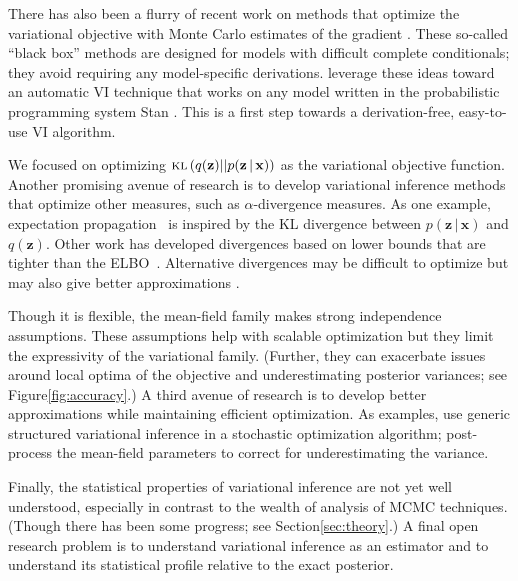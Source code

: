 \documentclass{article}
\begin{document}
There has also been a flurry of recent work on methods that optimize
the variational objective with Monte Carlo estimates of the gradient
\citep{kingma2013auto,rezende2014stochastic,ranganath2014black,
  salimans2014using,titsias2014doubly,Titsias:2015}.  These so-called
``black box'' methods are designed for models with difficult complete
conditionals; they avoid requiring any model-specific
derivations. \citet{kucukelbir2015automatic} leverage these ideas
toward an automatic \gls{VI} technique that works on any model written
in the probabilistic programming system Stan \citep{stan-manual:2015}.
This is a first step towards a derivation-free, easy-to-use \gls{VI}
algorithm.

We focused on optimizing ${\textsc{kl}\left({q({\mathbf{z}}) || p({\mathbf{z}} {\,\vert\,} {\mathbf{x}})}\right)}$ as the
variational objective function.  Another promising avenue of research
is to develop variational inference methods that optimize other
measures, such as $\alpha$-divergence measures.  As one example,
expectation propagation~\citep{minka2001expectation} is inspired by
the \gls{KL} divergence between $p({\mathbf{z}} {\,\vert\,} {\mathbf{x}})$ and $q({\mathbf{z}})$.  Other
work has developed divergences based on lower bounds that are tighter
than the \gls{ELBO}~\citep{Barber:1999,Leisink:2001}. Alternative
divergences may be difficult to optimize but may also give better
approximations \citep{minka2005divergence,opper2005expectation}.

Though it is flexible, the mean-field family makes strong independence
assumptions.  These assumptions help with scalable optimization but
they limit the expressivity of the variational family.  (Further, they
can exacerbate issues around local optima of the objective and
underestimating posterior variances; see Figure\nobreakspace \ref {fig:accuracy}.) A third
avenue of research is to develop better approximations while
maintaining efficient optimization.  As examples,
\citet{hoffman2014structured} use generic structured variational
inference in a stochastic optimization algorithm;
\citet{giordano2015linear} post-process the mean-field parameters to
correct for underestimating the variance.

Finally, the statistical properties of variational inference are not
yet well understood, especially in contrast to the wealth of analysis
of \gls{MCMC} techniques.  (Though there has been some progress; see
Section\nobreakspace \ref {sec:theory}.)  A final open research problem is to understand
variational inference as an estimator and to understand its
statistical profile relative to the exact posterior.
 
\end{document}
